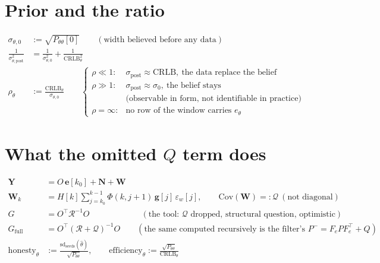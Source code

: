 \documentclass[11pt,a4paper,fontset=none]{ctexart}
\begin{document}
\section{Prior and the ratio}

\begin{align*}
\sigma_{\theta,0} &:= \sqrt{P_{\theta\theta}[0]} \qquad(\text{width believed before any data}) \\
\frac{1}{\sigma_{\theta,\mathrm{post}}^{2}} &= \frac{1}{\sigma_{\theta,0}^{2}} + \frac{1}{\mathrm{CRLB}_\theta^{2}} \\[4pt]
\rho_\theta &:= \frac{\mathrm{CRLB}_\theta}{\sigma_{\theta,0}} \qquad
\begin{cases} \rho \ll 1 : & \sigma_{\mathrm{post}} \approx \mathrm{CRLB},\ \text{the data replace the belief} \\
              \rho \gg 1 : & \sigma_{\mathrm{post}} \approx \sigma_0,\ \text{the belief stays} \\
                           & \text{(observable in form, not identifiable in practice)} \\
              \rho = \infty : & \text{no row of the window carries } e_\theta \end{cases}
\end{align*}

\section{What the omitted $Q$ term does}

\begin{align*}
\mathbf{Y} &= O\,\mathbf{e}[k_0] + \mathbf{N} + \mathbf{W} \\
\mathbf{W}_k &= H[k]\sum_{j=k_0}^{k-1}\Phi(k,j+1)\,\mathbf{g}[j]\,\varepsilon_w[j], \qquad \mathrm{Cov}(\mathbf{W}) =: \mathcal{Q} \ (\text{not diagonal}) \\
G &= O^{\top}\mathcal{R}^{-1}O \qquad\qquad\qquad\ (\text{the tool: } \mathcal{Q} \text{ dropped, structural question, optimistic}) \\
G_{\mathrm{full}} &= O^{\top}(\mathcal{R} + \mathcal{Q})^{-1}O \qquad(\text{the same computed recursively is the filter's } P^{-} = F_e P F_e^{\top} + Q) \\[4pt]
\text{honesty}_\theta &:= \frac{\mathrm{sd}_{\mathrm{seeds}}(\hat\theta)}{\sqrt{P_{\theta\theta}}}, \qquad
\text{efficiency}_\theta := \frac{\sqrt{P_{\theta\theta}}}{\mathrm{CRLB}_\theta}
\end{align*}
\end{document}
